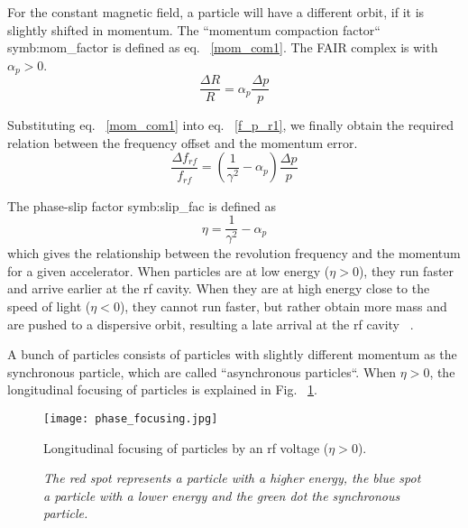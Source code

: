For the constant magnetic field, a particle will have a different orbit, if it is slightly shifted in momentum. The ``momentum compaction factor`` \gls{symb:mom_factor} is defined as eq. ~\ref{mom_com1}. The FAIR complex is with $\alpha_p>0$.
\begin{equation}
\frac{\Delta R}{R}=\alpha_p\frac{\Delta p}{p}\label{mom_com1}
\end{equation} 

Substituting eq. ~\ref{mom_com1} into eq. ~\ref{f_p_r1}, we finally obtain the required relation between the frequency offset and the momentum error.
\begin{equation}
\frac{\Delta f_{\mathit{rf}}}{f_{\mathit{rf}}} = (\frac{1}{\gamma^2}-\alpha_{\mathit{p}})\frac{\Delta{p}}{p}
\label{eq:phaseP1}
\end{equation}

The phase-slip factor \gls{symb:slip_fac} is defined as
\begin{equation}
\label{eq:phse_slip}
\eta =\frac{1}{\gamma^2}-\alpha_{\mathit{p}}
\end{equation}
which gives the relationship between the revolution frequency and the momentum for a given accelerator. When particles are at low energy ($\eta > 0$), they run faster and arrive earlier at the rf cavity. When they are at high energy close to the speed of light ($\eta < 0$), they cannot run faster, but rather obtain more mass and are pushed to a dispersive orbit, resulting a late arrival at the rf cavity ~\cite{lee_accelerator_2011}. 

A bunch of particles consists of particles with slightly different momentum as the synchronous particle, which are called ``asynchronous particles``. When $\eta > 0$, the longitudinal focusing of particles is explained in Fig. ~\ref{phase_focusing}. 
\begin{figure}[!htb]
   \centering   
   \texttt{[image: phase\_focusing.jpg]}
   \caption{Longitudinal focusing of particles by an rf voltage ($\eta > 0$).}
	\caption*{\textsl{\small{The red spot represents a particle with a higher energy, the blue spot a particle with a lower energy and the green dot the synchronous particle.}}}
   \label{phase_focusing}
\end{figure}

